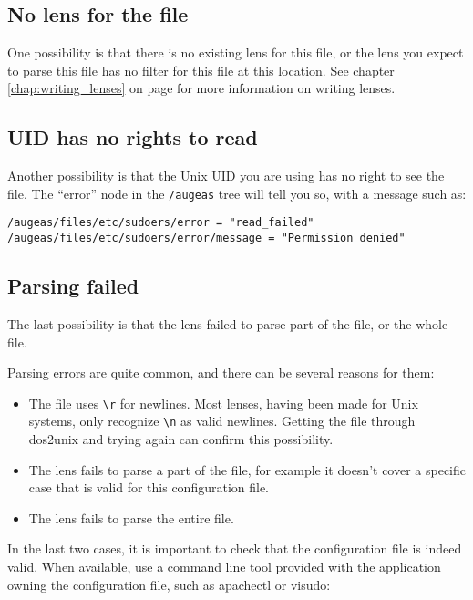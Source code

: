 \subsection{No lens for the file}

One possibility is that there is no existing lens for this file, or the lens you expect to parse this file has no filter for this file at this location. See chapter \ref{chap:writing_lenses} on page \pageref{chap:writing_lenses} for more information on writing lenses.

\subsection{UID has no rights to read}

Another possibility is that the Unix UID you are using has no right to see the file. The ``error'' node in the \verb!/augeas! tree will tell you so, with a message such as:


\begin{verbatim}
/augeas/files/etc/sudoers/error = "read_failed"
/augeas/files/etc/sudoers/error/message = "Permission denied"
\end{verbatim}

\subsection{Parsing failed}

The last possibility is that the lens failed to parse part of the file, or the whole file.

Parsing errors are quite common, and there can be several reasons for them:

\begin{itemize}
\item
  The file uses \verb!\r! for newlines. Most lenses, having been made for Unix systems, only recognize \verb!\n! as valid newlines. Getting the file through dos2unix and trying again can confirm this possibility.
\item
  The lens fails to parse a part of the file, for example it doesn't cover a specific case that is valid for this configuration file.
\item
  The lens fails to parse the entire file.
\end{itemize}
In the last two cases, it is important to check that the configuration file is indeed valid. When available, use a command line tool provided with the application owning the configuration file, such as apachectl or visudo:

